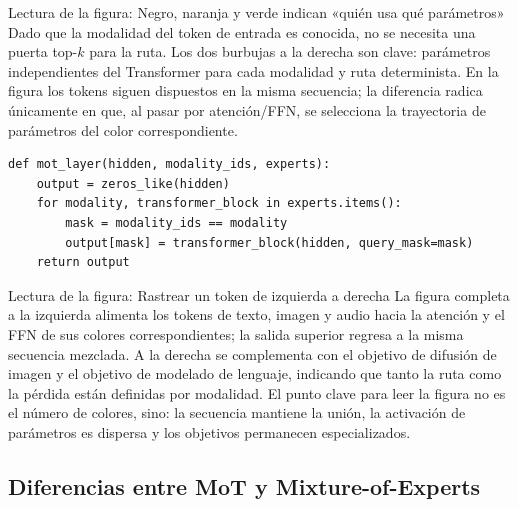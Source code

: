 \begin{knowledgebox}{Lectura de la figura: Negro, naranja y verde indican «quién usa qué parámetros»}
Dado que la modalidad del token de entrada es conocida, no se necesita una puerta top-$k$ para la ruta. Los dos burbujas a la derecha son clave: parámetros independientes del Transformer para cada modalidad y ruta determinista. En la figura los tokens siguen dispuestos en la misma secuencia; la diferencia radica únicamente en que, al pasar por atención/FFN, se selecciona la trayectoria de parámetros del color correspondiente.
\end{knowledgebox}

\begin{lstlisting}[caption={Ruta determinista de modalidad en MoT}]
def mot_layer(hidden, modality_ids, experts):
    output = zeros_like(hidden)
    for modality, transformer_block in experts.items():
        mask = modality_ids == modality
        output[mask] = transformer_block(hidden, query_mask=mask)
    return output
\end{lstlisting}


\begin{knowledgebox}{Lectura de la figura: Rastrear un token de izquierda a derecha}
La figura completa a la izquierda alimenta los tokens de texto, imagen y audio hacia la atención y el FFN de sus colores correspondientes; la salida superior regresa a la misma secuencia mezclada. A la derecha se complementa con el objetivo de difusión de imagen y el objetivo de modelado de lenguaje, indicando que tanto la ruta como la pérdida están definidas por modalidad. El punto clave para leer la figura no es el número de colores, sino: la secuencia mantiene la unión, la activación de parámetros es dispersa y los objetivos permanecen especializados.
\end{knowledgebox}


\subsection{Diferencias entre MoT y Mixture-of-Experts}

